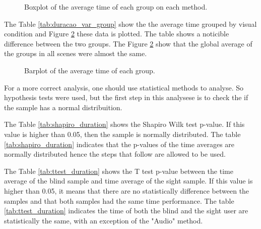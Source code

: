 

\begin{figure}[!htb]
    \centering
    \resizebox{0.6\linewidth}{!}{
    
    }
    \caption{Boxplot of the average time of each group on each method.}
    \label{fig:boxplot_duration_scene}
\end{figure}

The Table \ref{tab:duracao_var_group} show the the average time grouped by visual condition and Figure \ref{fig:barplot_duration_global} these data is plotted. The table shows a noticible difference between the two groups. The Figure \ref{fig:barplot_duration_global} show that the global average of the groups in all scenes were almost the same.



\begin{figure}[!htb]
    \centering
    \resizebox{0.6\linewidth}{!}{
    
    }
    \caption{Barplot of the average time of each group.}
    \label{fig:barplot_duration_global}
\end{figure}

For a more correct analysis, one should use statistical methods to analyse. So hypothesis tests were used, but the first step in this analysese is to check the if the sample has a normal distribuition. 

The Table \ref{tab:shapiro_duration} shows the Shapiro Wilk test p-value. If this value is higher than 0.05, then the sample is normally distributed. The table \ref{tab:shapiro_duration} indicates that the p-values of the time averages are normally distributed hence the steps that follow are allowed to be used.



The Table \ref{tab:ttest_duration} shows the T test p-value between the time average of the blind sample and time average of the sight sample. If this value is higher than 0.05, it means that there are no statistically difference between the samples and that both samples had the same time performance. The table \ref{tab:ttest_duration} indicates the time of both the blind and the sight user are statistically the same, with an exception of the "Audio" method.



